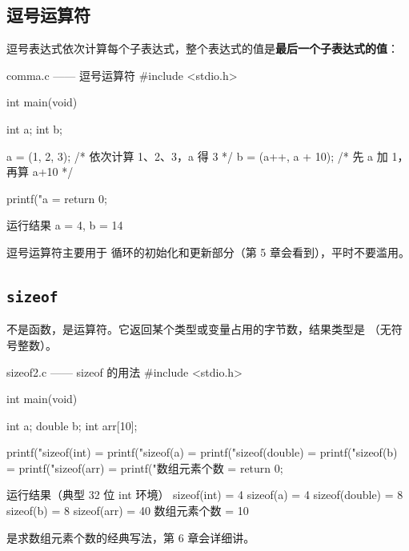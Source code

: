 \subsection{逗号运算符}

逗号表达式依次计算每个子表达式，整个表达式的值是\textbf{最后一个子表达式的值}：

\begin{codebox}{comma.c —— 逗号运算符}
#include <stdio.h>

int main(void)
{
    int a;
    int b;

    a = (1, 2, 3);      /* 依次计算 1、2、3，a 得 3 */
    b = (a++, a + 10);  /* 先 a 加 1，再算 a+10 */

    printf("a = %
    return 0;
}
\end{codebox}

\begin{outbox}{运行结果}
a = 4, b = 14
\end{outbox}

逗号运算符主要用于  循环的初始化和更新部分（第 5 章会看到），平时不要滥用。

\subsection{\texttt{sizeof}}

 不是函数，是运算符。它返回某个类型或变量占用的字节数，结果类型是 （无符号整数）。

\begin{codebox}{sizeof2.c —— sizeof 的用法}
#include <stdio.h>

int main(void)
{
    int a;
    double b;
    int arr[10];

    printf("sizeof(int)    = %
    printf("sizeof(a)      = %
    printf("sizeof(double) = %
    printf("sizeof(b)      = %
    printf("sizeof(arr)    = %
    printf("数组元素个数   = %
    return 0;
}
\end{codebox}

\begin{outbox}{运行结果（典型 32 位 int 环境）}
sizeof(int)    = 4
sizeof(a)      = 4
sizeof(double) = 8
sizeof(b)      = 8
sizeof(arr)    = 40
数组元素个数   = 10
\end{outbox}

 是求数组元素个数的经典写法，第 6 章会详细讲。

